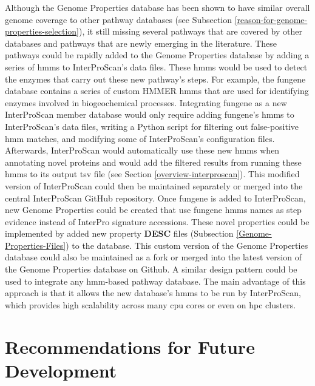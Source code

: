 Although the Genome Properties database has been shown to have similar overall 
genome coverage to other pathway databases (see Subsection 
\ref{reason-for-genome-properties-selection}), it still missing several pathways 
that are covered by other databases and pathways that are newly emerging in the 
literature. These pathways could be rapidly added to the Genome Properties 
database by adding a series of \gls{hmm}s \cite{eddy2011accelerated} to 
InterProScan's data files. These \gls{hmm}s would be used to detect the enzymes 
that carry out these new pathway's steps. For example, the \gls{fungene} 
\cite{fish2013fungene} database contains a series of custom HMMER 
\cite{eddy2011accelerated} \gls{hmm}s that are used for identifying enzymes 
involved in biogeochemical processes. Integrating \gls{fungene} as a new InterProScan 
member database would only require adding \gls{fungene}'s \gls{hmm}s to InterProScan's 
data files, writing a Python script for filtering out false-positive \gls{hmm} 
matches, and modifying some of InterProScan's configuration files. Afterwards, 
InterProScan would automatically use these new \gls{hmm}s when annotating novel 
proteins and would add the filtered results from running these \gls{hmm}s to its 
output \gls{tsv} file (see Section \ref{overview-interproscan}). This modified 
version of InterProScan could then be maintained separately or merged into the 
central InterProScan GitHub repository. Once \gls{fungene} is added to InterProScan, 
new Genome Properties could be created that use \gls{fungene} \gls{hmm}s names as step 
evidence instead of InterPro signature accessions. These novel properties could 
be implemented by added new property \textbf{DESC} files (Subsection 
\ref{Genome-Properties-Files}) to the database. This custom version of the 
Genome Properties database could also be maintained as a fork or merged into the 
latest version of the Genome Properties database on Github. A similar design 
pattern could be used to integrate any \gls{hmm}-based pathway database. The 
main advantage of this approach is that it allows the new database's \gls{hmm}s 
to be run by InterProScan, which provides high scalability across many \gls{cpu} 
cores or even on \gls{hpc} clusters.

\section{Recommendations for Future Development}

